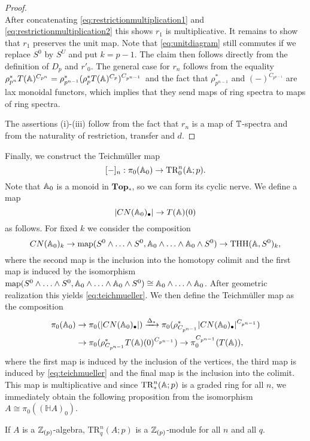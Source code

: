 \begin{proof}
\begin{equation}
\end{equation}
After concatenating \eqref{eq:restrictionmultiplication1} and \eqref{eq:restrictionmultiplication2}
this shows $r_1$ is multiplicative.
It remains to show that $r_1$ preserves the unit map. Note that  \eqref{eq:unitdiagram}
still commutes if we replace $S^0$ by $S^U$ and put $k=p-1$. The claim then follows
directly from the definition of $D_p$ and $r'_0$. The general case for $r_n$
follows from the equality
$\rho_{p^{n}}^\ast T(\mathbb{A})^{C_{p^n}}= \rho_{p^{n-1}}^\ast(\rho_p^\ast T(\mathbb{A})^{C_p})^{C_{p^{n-1}}}$
and the fact that $\rho_{p^{n-1}}^\ast$ and $(-)^{C_{p^{n-1}}}$ are lax monoidal
functors, which implies that they send maps of ring spectra to maps of ring
spectra.

The assertions (i)-(iii) follow from the fact that $r_n$ is a map of $\mathbb{T}$-spectra
and from the naturality of restriction, transfer and $d$.
\end{proof}

Finally, we construct the Teichm\"uller map
\[
[-]_n:\pi_0(\mathbb{A}_0)\to \mathrm{TR}_0^n(\mathbb{A};p).
\]
Note that $\mathbb{A}_0$ is a monoid in $\mathbf{Top}_\ast$,
so we can form its cyclic nerve. We define a map
\begin{equation}\label{eq:teichmueller}
|CN(\mathbb{A}_0)_\bullet|\to  T(\mathbb{A})(0)
\end{equation}
as follows. For fixed $k$ we consider the composition 
\[
CN(\mathbb{A}_0)_k\to \mathrm{map}(S^0\wedge \ldots\wedge S^0,
\mathbb{A}_0\wedge\ldots\wedge \mathbb{A}_0\wedge S^0)
\to \mathrm{THH}(\mathbb{A}, S^0)_k,
\]
where the second map is the inclusion into the homotopy colimit 
and the first map is induced by the isomorphism
$\mathrm{map}(S^0\wedge \ldots\wedge S^0,
\mathbb{A}_0\wedge\ldots\wedge \mathbb{A}_0\wedge S^0)
\cong \mathbb{A}_0\wedge\ldots\wedge \mathbb{A}_0$.
After geometric realization this yields \eqref{eq:teichmueller}.
We then define the Teichm\"uller map as the composition
\begin{align*}
\pi_0(\mathbb{A}_0)&\to \pi_0(|CN(\mathbb{A}_0)_\bullet|)
\xrightarrow{\Delta_\ast}
\pi_0(\rho^\ast_{C_{p^{n-1}}}|CN(\mathbb{A}_0)_\bullet|^{C_{p^{n-1}}})\\
&\to \pi_0(\rho^\ast_{C_{p^{n-1}}}T(\mathbb{A})(0)^{C_{p^{n-1}}})
\to \pi_0^{C_{p^{n-1}}}(T(\mathbb{A})),
\end{align*}
where the first map is induced by the inclusion of the vertices,
 the third map is induced by \eqref{eq:teichmueller}
 and the final map is the inclusion into the colimit.
This map is multiplicative and since $\mathrm{TR}_\ast^n(\mathbb{A};p)$
is a graded ring for all $n$, we immediately obtain the following
proposition from the isomorphism $A\cong \pi_0((\mathbb{H}A)_0)$.

\begin{prop}\label{prop:thhplocalization}
If $A$ is a $\mathbb{Z}_{(p)}$-algebra, $\mathrm{TR}_q^n(A;p)$ is a $\mathbb{Z}_{(p)}$-module
for all $n$ and all $q$.
\end{prop}
